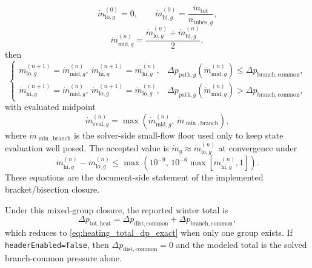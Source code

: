 \documentclass[11pt]{article}
\begin{document}
\begin{equation}
\label{eq:group_inner_bracket_init}
\dot m_{\mathrm{lo},g}^{(0)}=0,
\qquad
\dot m_{\mathrm{hi},g}^{(0)}=\frac{\dot m_{\mathrm{tot}}}{n_{\mathrm{tubes},g}},
\end{equation}
\begin{equation}
\label{eq:group_inner_midpoint}
\dot m_{\mathrm{mid},g}^{(n)}=\frac{\dot m_{\mathrm{lo},g}^{(n)}+\dot m_{\mathrm{hi},g}^{(n)}}{2},
\end{equation}
then
\begin{equation}
\label{eq:group_inner_update}
\begin{cases}
\dot m_{\mathrm{lo},g}^{(n+1)}=\dot m_{\mathrm{mid},g}^{(n)},\ \dot m_{\mathrm{hi},g}^{(n+1)}=\dot m_{\mathrm{hi},g}^{(n)}, & \Delta p_{\mathrm{path},g}(\dot m_{\mathrm{mid},g}^{(n)})\le \Delta p_{\mathrm{branch,common}},\\
\dot m_{\mathrm{hi},g}^{(n+1)}=\dot m_{\mathrm{mid},g}^{(n)},\ \dot m_{\mathrm{lo},g}^{(n+1)}=\dot m_{\mathrm{lo},g}^{(n)}, & \Delta p_{\mathrm{path},g}(\dot m_{\mathrm{mid},g}^{(n)})> \Delta p_{\mathrm{branch,common}},
\end{cases}
\end{equation}
with evaluated midpoint
\begin{equation}
\label{eq:group_inner_flow_floor}
\dot m_{\mathrm{eval},g}^{(n)}=\max\!\left(\dot m_{\mathrm{mid},g}^{(n)},\,\dot m_{\min,\mathrm{branch}}\right),
\end{equation}
where \(\dot m_{\min,\mathrm{branch}}\) is the solver-side small-flow floor used only to keep state evaluation well posed. The accepted value is \(\dot m_g\approx\dot m_{\mathrm{lo},g}^{(n)}\) at convergence under
\begin{equation}
\label{eq:group_inner_stop}
\dot m_{\mathrm{hi},g}^{(n)}-\dot m_{\mathrm{lo},g}^{(n)}
\le
\max\!\left(10^{-9},\,10^{-6}\max\!\left[\dot m_{\mathrm{hi},g}^{(n)},1\right]\right).
\end{equation}
These equations are the document-side statement of the implemented bracket/bisection closure.

Under this mixed-group closure, the reported winter total is
\begin{equation}
\label{eq:heating_total_dp_redistributed}
\Delta p_{\mathrm{tot,heat}}=\Delta p_{\mathrm{dist,common}}+\Delta p_{\mathrm{branch,common}},
\end{equation}
which reduces to \eqref{eq:heating_total_dp_exact} when only one group exists. If \texttt{headerEnabled=false}, then \(\Delta p_{\mathrm{dist,common}}=0\) and the modeled total is the solved branch-common pressure alone.
\end{document}
